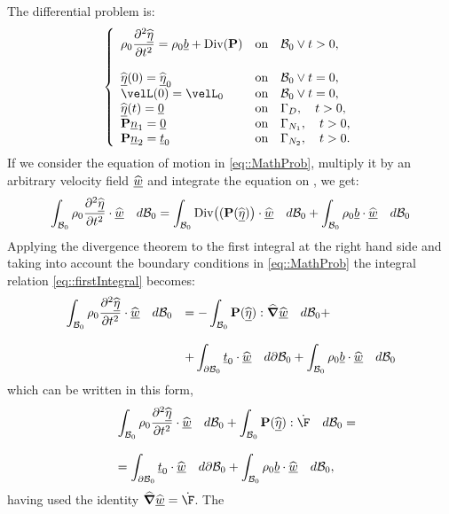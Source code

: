 The differential problem is:
\begin{equation} \left\{
\begin{array}{lllllll} \displaystyle
\rho_0\frac{\partial^2\displL}{\partial
t^2}=\rho_0\underline{b}+\text{Div}(\Piola) & \text{on} \quad \RefConE
\vee t>0,\\ \\ \displL(0)=\displL_0 & \text{on} \quad \RefConE \vee
t=0,\\ \velL(0)=\velL_0 & \text{on} \quad \RefConE \vee t=0,\\
\displL(t)=\underline{0} & \text{on} \quad \Gamma_D, \quad t>0,\\
\Piola\underline{n}_1=\underline{0} & \text{on} \quad \Gamma_{N_1},
\quad t>0,\\ \Piola\underline{n}_2=\underline{t}_0 & \text{on} \quad
\Gamma_{N_2}, \quad t>0.\\
\end{array}\right.
\label{eq::MathProb}
\end{equation} If we consider the equation of motion in
\eqref{eq::MathProb}, multiply it by an arbitrary velocity field
$\widehat{\underline{w}}$ and integrate the equation on \RefCon, we get:
\begin{equation} \displaystyle \int_{\mathcal{B}_0}\rho_0\frac{\partial^2
\widehat{\underline{\eta}}}{\partial t^2}\cdot\widehat{\underline{w}}\quad d\mathcal{B}_0 =
\int_{\mathcal{B}_0}\text{Div}\big((\textbf{P}(\widehat{\underline{\eta}})\big)\cdot\widehat{\underline{w}}\quad d\mathcal{B}_0 +
\int_{\mathcal{B}_0}\rho_0\underline{b}\cdot\widehat{\underline{w}}\quad d\mathcal{B}_0
  \label{eq::firstIntegral}
\end{equation} Applying the divergence theorem to the first integral
at the right hand side and taking into account the boundary conditions
in \eqref{eq::MathProb} the integral relation
\eqref{eq::firstIntegral} becomes:
\begin{equation}
  \begin{array}{lll} \displaystyle
\int_{\mathcal{B}_0}\rho_0\frac{\partial^2 \widehat{\underline{\eta}}}{\partial
t^2}\cdot\widehat{\underline{w}}\quad d\mathcal{B}_0 & = \displaystyle -
\int_{\mathcal{B}_0}\textbf{P}(\widehat{\underline{\eta}}):\widehat{\boldsymbol{\nabla}}\widehat{\underline{w}}\quad d\mathcal{B}_0 + \\ \\ &
\displaystyle + \int_{\partial
\mathcal{B}_0}\underline{t}_0\cdot\widehat{\underline{w}}\quad d\partial\mathcal{B}_0 +
\int_{\mathcal{B}_0}\rho_0 \underline{b}\cdot\widehat{\underline{w}}\quad d\mathcal{B}_0
    \end{array}
  \label{eq::secondIntegral}
\end{equation} which can be written in this form,
\begin{equation}
  \begin{array}{lll} & \displaystyle
\int_{\RefConE}\rho_0\frac{\partial^2 \displL}{\partial
t^2}\cdot\velwE\quad d\RefConE +
\int_{\RefConE}\Piola(\displL):\dot{\F}\quad d\RefConE = \\ \\ &
\displaystyle = \int_{\partial
\RefConE}\underline{t}_0\cdot\velwE\quad d\partial\RefConE +
\int_{\RefConE}\rho_0 \underline{b}\cdot\velwE\quad d\RefConE,
    \end{array}
  \label{eq::secondIntegral}
\end{equation} having used the identity $\delOp\velwE = \dot{\F}$. The
